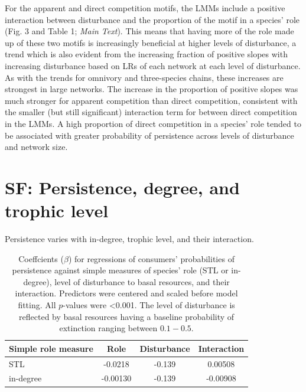 \documentclass[12pt]{article}
\begin{document}
\begin{spacing}{2.0}
    
    For the apparent and direct competition motifs, the LMMs include a positive interaction between disturbance and the proportion of the motif in a species' role (Fig. 3 and Table 1; \emph{Main Text}).
    This means that having more of the role made up of these two motifs is increasingly beneficial at higher levels of disturbance, a trend which is also evident from the increasing fraction of positive slopes with increasing disturbance based on LRs of each network at each level of disturbance. %
    As with the trends for omnivory and three-species chains, these increases are strongest in large networks. %
    The increase in the proportion of positive slopes was much stronger for apparent competition than direct competition, consistent with the smaller (but still significant) interaction term for between direct competition in the LMMs.
    A high proportion of direct competition in a species' role tended to be associated with greater probability of persistence across levels of disturbance and network size.
\clearpage
                
            
\section{SF: Persistence, degree, and trophic level}


    Persistence varies with in-degree, trophic level, and their interaction.

    \begin{table}[h!]
        \caption{Coeffcients ($\beta$) for regressions of consumers' probabilities of persistence against simple measures of species' role (STL or in-degree), level of disturbance to basal resources, and their interaction. Predictors were centered and scaled before model fitting. All $p$-values were \textless0.001. The level of disturbance is reflected by basal resources having a baseline probability of extinction ranging between $0.1 - 0.5$.}
        \label{tab:per_vs_TLdeg}
        \centering
        \begin{tabular}{l|c  c  c |}
            Simple role measure & Role & Disturbance & Interaction \\
            \hline
            STL & -0.0218 & -0.139 & 0.00508 \\
            in-degree & -0.00130 & -0.139 & -0.00908 \\
        \end{tabular}
    \end{table}



\end{spacing}
\end{document}

